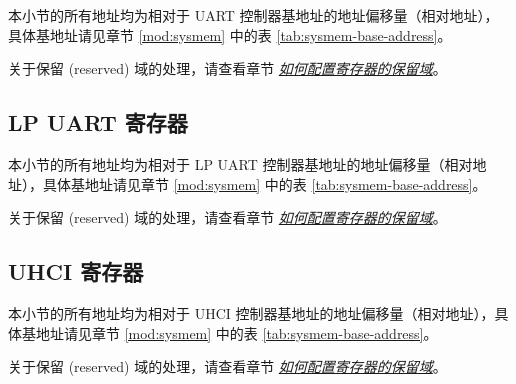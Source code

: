 \documentclass[main\_\_CN.tex]{subfiles}
\begin{document}
本小节的所有地址均为相对于 UART 控制器基地址的地址偏移量（相对地址），具体基地址请见章节 \ref{mod:sysmem} \textit{} 中的表 \ref{tab:sysmem-base-address}。

关于保留 (reserved) 域的处理，请查看章节 \hyperref[programming-reserved-field]{\textit{如何配置寄存器的保留域}}。




\clearpage
\subsection{LP UART 寄存器}

本小节的所有地址均为相对于 LP UART 控制器基地址的地址偏移量（相对地址），具体基地址请见章节 \ref{mod:sysmem} \textit{} 中的表 \ref{tab:sysmem-base-address}。

关于保留 (reserved) 域的处理，请查看章节 \hyperref[programming-reserved-field]{\textit{如何配置寄存器的保留域}}。




\clearpage
\subsection{UHCI 寄存器}

本小节的所有地址均为相对于 UHCI 控制器基地址的地址偏移量（相对地址），具体基地址请见章节 \ref{mod:sysmem} \textit{} 中的表 \ref{tab:sysmem-base-address}。

关于保留 (reserved) 域的处理，请查看章节 \hyperref[programming-reserved-field]{\textit{如何配置寄存器的保留域}}。


\end{document}
